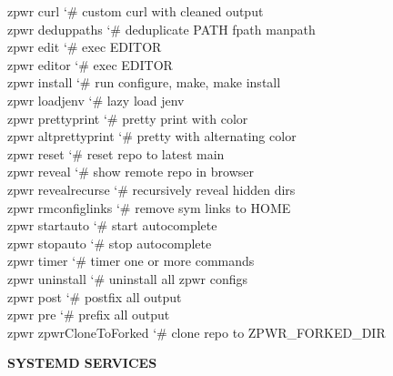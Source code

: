 \documentclass[11pt,a4paper,twoside]{book}
\begin{document}
\begin{codebox}
\color{neongreen}zpwr curl                  {\char`\#} custom curl with cleaned output\\
\color{neongreen}zpwr deduppaths            {\char`\#} deduplicate PATH fpath manpath\\
\color{neongreen}zpwr edit                  {\char`\#} exec EDITOR\\
\color{neongreen}zpwr editor                {\char`\#} exec EDITOR\\
\color{neongreen}zpwr install               {\char`\#} run configure, make, make install\\
\color{neongreen}zpwr loadjenv              {\char`\#} lazy load jenv\\
\color{neongreen}zpwr prettyprint           {\char`\#} pretty print with color\\
\color{neongreen}zpwr altprettyprint        {\char`\#} pretty with alternating color\\
\color{neongreen}zpwr reset                 {\char`\#} reset repo to latest main\\
\color{neongreen}zpwr reveal                {\char`\#} show remote repo in browser\\
\color{neongreen}zpwr revealrecurse         {\char`\#} recursively reveal hidden dirs\\
\color{neongreen}zpwr rmconfiglinks         {\char`\#} remove sym links to HOME\\
\color{neongreen}zpwr startauto             {\char`\#} start autocomplete\\
\color{neongreen}zpwr stopauto              {\char`\#} stop autocomplete\\
\color{neongreen}zpwr timer                 {\char`\#} timer one or more commands\\
\color{neongreen}zpwr uninstall             {\char`\#} uninstall all zpwr configs\\
\color{neongreen}zpwr post                  {\char`\#} postfix all output\\
\color{neongreen}zpwr pre                   {\char`\#} prefix all output\\
\color{neongreen}zpwr zpwrCloneToForked     {\char`\#} clone repo to ZPWR\_FORKED\_DIR\\
\end{codebox}


\vspace{12pt}
{\bfseries\color{neonyellow} SYSTEMD SERVICES}\vspace{4pt}
\end{document}
